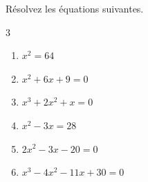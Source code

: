 %
%
    Résolvez les équations suivantes.
    \begin{multicols}{3}
        \begin{enumerate}
            \item \(x^2 = 64\) %
            \item \(x^2 + 6x + 9 = 0\) %
            \item \(x^3 + 2 x^2 + x = 0\) %
            \item \(x^2 -3x = 28 \) %
            \item \(2x^2-3x-20=0\) %
            \item \(x^3 - 4x^2 - 11x + 30 = 0\) %
        \end{enumerate}
    \end{multicols}
